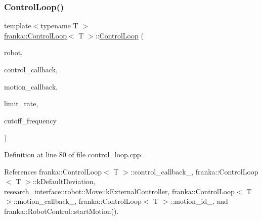 \subsubsection{\texorpdfstring{Control\+Loop()}{ControlLoop()}\hspace{0.1cm}{\footnotesize\ttfamily [1/3]}}
{\footnotesize\ttfamily template$<$typename T $>$ \\
\hyperlink{classfranka_1_1ControlLoop}{franka\+::\+Control\+Loop}$<$ T $>$\+::\hyperlink{classfranka_1_1ControlLoop}{Control\+Loop} (\begin{DoxyParamCaption}\item[{\hyperlink{classfranka_1_1RobotControl}{Robot\+Control} \&}]{robot,  }\item[{\hyperlink{classfranka_1_1ControlLoop_a1b050245c6f2795d491899440f95cec3}{Control\+Callback}}]{control\+\_\+callback,  }\item[{\hyperlink{classfranka_1_1ControlLoop_a23624d5a86fe2b206986af4757ba1822}{Motion\+Generator\+Callback}}]{motion\+\_\+callback,  }\item[{\hyperlink{classbool}{bool}}]{limit\+\_\+rate,  }\item[{double}]{cutoff\+\_\+frequency }\end{DoxyParamCaption})}



Definition at line 80 of file control\+\_\+loop.\+cpp.



References franka\+::\+Control\+Loop$<$ T $>$\+::control\+\_\+callback\+\_\+, franka\+::\+Control\+Loop$<$ T $>$\+::k\+Default\+Deviation, research\+\_\+interface\+::robot\+::\+Move\+::k\+External\+Controller, franka\+::\+Control\+Loop$<$ T $>$\+::motion\+\_\+callback\+\_\+, franka\+::\+Control\+Loop$<$ T $>$\+::motion\+\_\+id\+\_\+, and franka\+::\+Robot\+Control\+::start\+Motion().


